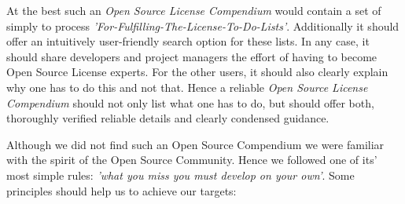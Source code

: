 At the best such an \textit{Open Source License Compendium} would contain a set
of simply to process \textit{'For-Fulfilling-The-License-To-Do-Lists'}.
Additionally it should offer an intuitively user-friendly search option for
these lists. In any case, it should share developers and project managers the
effort of having to become Open Source License experts. For the other users, it
should also clearly explain why one has to do this and not that. Hence a
reliable \textit{Open Source License Compendium} should not only list what one
has to do, but should offer both, thoroughly verified reliable details and
clearly condensed guidance.

Although we did not find such an Open Source Compendium we were familiar with
the spirit of the Open Source Community. Hence we followed one of its' most
simple rules: \emph{'what you miss you must develop on your own'}. Some
principles should help us to achieve our targets:

